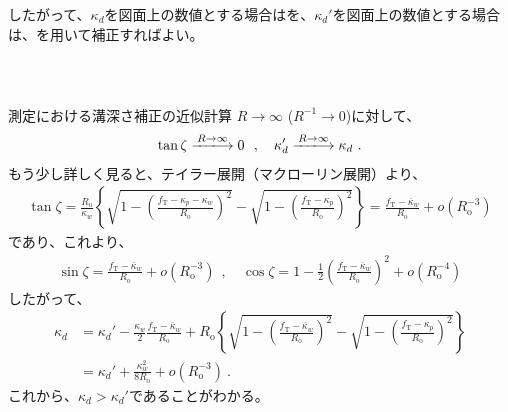 したがって、$\kappa_d$を図面上の数値とする場合はを、$\kappa_d'$を図面上の数値とする場合は、を用いて補正すればよい。


\clearpage
~\vfill
\begin{Column}{測定における溝深さ補正の近似計算}
$R\to\infty$ ($R^{-1}\to0$)に対して、
\begin{align*}
  \tan\zeta \xlongrightarrow{R\to\infty} 0~~, \quad
  \kappa_d' \xlongrightarrow{R\to\infty} \kappa_d\ .
\end{align*}
もう少し詳しく見ると、テイラー展開（マクローリン展開）より、
\begin{align*}
  \tan\zeta
  = \frac{R_\mathrm o}{\kappa_w}\!
     \left\{
     \sqrt{1-\left(\frac{f_\mathrm T-\kappa_p-\kappa_w}{R_\mathrm o}\right)^{\!\!2}}
     -\sqrt{1-\left(\frac{f_\mathrm T-\kappa_p}{R_\mathrm o}\right)^{\!\!2}}
     \right\}
  = \frac{f_\mathrm T-\bar\kappa_w}{R_\mathrm o}+o\!\left(R_\mathrm o^{-3}\right)
\end{align*}
であり、これより、
\begin{align*}
  \sin\zeta = \frac{f_\mathrm T-\bar\kappa_w}{R_\mathrm o}+o\!\left(R_\mathrm o^{-3}\right)~~, \quad
  \cos\zeta = 1-\frac12\!\left(\frac{f_\mathrm T-\bar\kappa_w}{R_\mathrm o}\right)^{\!\!2}
              +o\!\left(R_\mathrm o^{-4}\right)
\end{align*}
したがって、
\begin{align*}
  \kappa_d
  &= \kappa_d'-\frac{\kappa_w}2\frac{f_\mathrm T-\bar\kappa_w}{R_\mathrm o}
     +R_\mathrm o\!
      \left\{
      \sqrt{1-\left(\frac{f_\mathrm T-\bar\kappa_w}{R_\mathrm o}\right)^{\!\!2}}
      -\sqrt{1-\left(\frac{f_\mathrm T-\kappa_p}{R_\mathrm o}\right)^{\!\!2}}
      \right\}\\
  &= \kappa_d'+\frac{\kappa_w^2}{8R_\mathrm o}
     +o\!\left(R_\mathrm o^{-3}\right)\ .
\end{align*}
これから、$\kappa_d > \kappa_d'$であることがわかる。
\end{Column}






